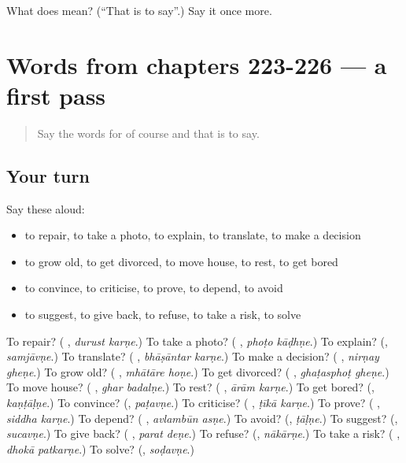 \begin{tcolorbox}[breakable,colback=teal!4,colframe=teal!35!black,title={Before you move on}]
What does  mean? (\textquotedblleft{}That is to say\textquotedblright{}.) Say it once more.
\end{tcolorbox}
\section[(dialogue)]{Words from chapters 223-226 — a first pass}

\label{lesson:MR-R231-first-pass-words-from-chapters-223-226}



\begin{quote}
Say the words for of course and that is to say.
\end{quote}

\subsection*{Your turn}
Say these aloud:

\begin{itemize}
\raggedright
  \item to repair, to take a photo, to explain, to translate, to make a decision
  \item to grow old, to get divorced, to move house, to rest, to get bored
  \item to convince, to criticise, to prove, to depend, to avoid
  \item to suggest, to give back, to refuse, to take a risk, to solve
\end{itemize}

\begin{tcolorbox}[breakable,colback=teal!4,colframe=teal!35!black,title={Before you move on}]
To repair? (\textbf{ }, \emph{durust karṇe}.) To take a photo? (\textbf{ }, \emph{phoṭo kāḍhṇe}.) To explain? (\textbf{}, \emph{samjāvṇe}.) To translate? (\textbf{ }, \emph{bhāṣāntar karṇe}.) To make a decision? (\textbf{ }, \emph{nirṇay gheṇe}.) To grow old? (\textbf{ }, \emph{mhātāre hoṇe}.) To get divorced? (\textbf{ }, \emph{ghaṭasphoṭ gheṇe}.) To move house? (\textbf{ }, \emph{ghar badalṇe}.) To rest? (\textbf{ }, \emph{ārām karṇe}.) To get bored? (\textbf{}, \emph{kaṇṭāḷṇe}.) To convince? (\textbf{}, \emph{paṭavṇe}.) To criticise? (\textbf{ }, \emph{ṭīkā karṇe}.) To prove? (\textbf{ }, \emph{siddha karṇe}.) To depend? (\textbf{ }, \emph{avlambūn asṇe}.) To avoid? (\textbf{}, \emph{ṭāḷṇe}.) To suggest? (\textbf{}, \emph{sucavṇe}.) To give back? (\textbf{ }, \emph{parat deṇe}.) To refuse? (\textbf{}, \emph{nākārṇe}.) To take a risk? (\textbf{ }, \emph{dhokā patkarṇe}.) To solve? (\textbf{}, \emph{soḍavṇe}.)
\end{tcolorbox}
